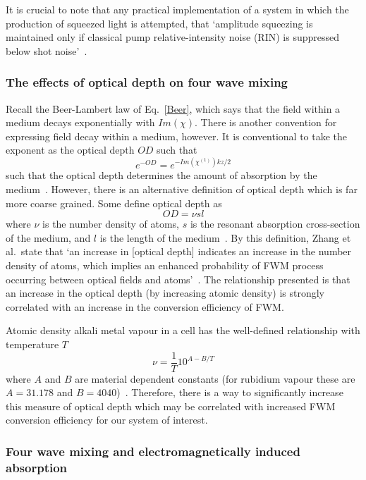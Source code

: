 \documentclass[aps,pra,showpacs,amsmath,amssymb,nofootinbib,longbibliography,superscriptaddress
]{revtex4-1}
\theoremstyle{definition}
\theoremstyle{remark}
\newcommand{\0}{\hat{0}}
\begin{document}
It is crucial to note that any practical implementation of a system in which the production of squeezed light is attempted, that `amplitude squeezing is maintained only if classical pump relative-intensity noise (RIN) is suppressed below shot noise'~\cite{Patel}.


\subsubsection{The effects of optical depth on four wave mixing}

Recall the Beer-Lambert law of Eq.~\eqref{Beer}, which says that the field within a medium decays exponentially with $Im(\chi)$. There is another convention for expressing field decay within a medium, however. It is conventional to take the exponent as the optical depth $OD$ such that
\begin{equation}\label{OD1}
    e^{-OD} = e^{-Im\left( \chi^{(1)} \right) k z / 2} 
\end{equation}
such that the optical depth determines the amount of absorption by the medium~\cite{MacRae}. However, there is an alternative definition of optical depth which is far more coarse grained. Some define optical depth as
\begin{equation}\label{OD2}
    OD = \nu s l
\end{equation}
where $\nu$ is the number density of atoms, $s$ is the resonant absorption cross-section of the medium, and $l$ is the length of the medium~\cite{Zhang}. By this definition, Zhang et al.~state that `an increase in [optical depth] indicates an increase in the number density of atoms, which implies an enhanced probability of FWM process occurring between optical fields and atoms'~\cite{Zhang}. The relationship presented is that an increase in the optical depth (by increasing atomic density) is strongly correlated with an increase in the conversion efficiency of FWM.

Atomic density alkali metal vapour in a cell has the well-defined relationship with temperature $T$
\begin{equation}
    \nu = \frac{1}{T}10^{A - B / T}
\end{equation}
where $A$ and $B$ are material dependent constants (for rubidium vapour these are $A = 31.178$ and $B = 4040$)~\cite{Vapour}. Therefore, there is a way to significantly increase this measure of optical depth which may be correlated with increased FWM conversion efficiency for our system of interest.

\subsubsection{Four wave mixing and electromagnetically induced absorption}
\end{document}
